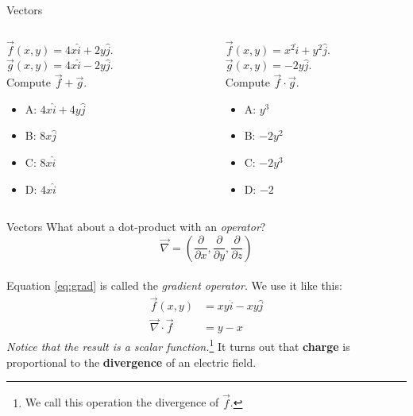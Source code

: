 \documentclass{beamer}
\begin{document}
\begin{frame}{Vectors}
\small
\begin{columns}[T]
\begin{column}{0.5\textwidth}
$\vec{f}(x,y) = 4x\hat{i}+2y\hat{j}$.  $\vec{g}(x,y) = 4x\hat{i}-2y\hat{j}$.  \\
Compute $\vec{f} + \vec{g}$.
\vspace{0.2cm}
\begin{itemize}
\item A: $4x\hat{i}+4y\hat{j}$
\item B: $8x\hat{j}$
\item C: $8x\hat{i}$
\item D: $4x\hat{i}$
\end{itemize}
\end{column}
\begin{column}{0.5\textwidth}
$\vec{f}(x,y) = x^2\hat{i}+y^2\hat{j}$.  $\vec{g}(x,y) = -2y\hat{j}$.  \\
Compute $\vec{f} \cdot \vec{g}$.
\vspace{0.2cm}
\begin{itemize}
\item A: $y^3$
\item B: $-2y^2$
\item C: $-2y^3$
\item D: $-2$
\end{itemize}
\end{column}
\end{columns}
\end{frame}

\begin{frame}{Vectors}
What about a dot-product with an \textit{operator}?\\
\begin{equation}
\vec{\nabla} = \left(\frac{\partial}{\partial x},\frac{\partial}{\partial y},\frac{\partial}{\partial z}\right) \label{eq:grad}
\end{equation} \\
Equation \ref{eq:grad} is called the \textit{gradient operator}.  We use it like this:
\begin{align}
\vec{f}(x,y) &= xy \hat{i} - xy \hat{j}\\
\vec{\nabla} \cdot \vec{f} &= y - x
\end{align}
\textit{Notice that the result is a scalar function.}\footnote{We call this operation the divergence of $\vec{f}$.}  It turns out that \textbf{charge} is proportional to the \textbf{divergence} of an electric field.
\end{frame}
\end{document}
